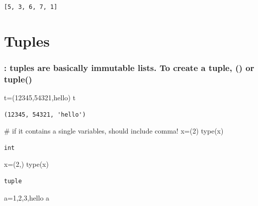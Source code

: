 \documentclass[
  letterpaper,
  DIV=11,
  numbers=noendperiod]{scrreprt}
\newenvironment{Shaded}{\begin{snugshade}}{\end{snugshade}}
\newcommand{\BuiltInTok}[1]{\textcolor[rgb]{0.00,0.23,0.31}{#1}}
\newcommand{\CommentTok}[1]{\textcolor[rgb]{0.37,0.37,0.37}{#1}}
\newcommand{\DecValTok}[1]{\textcolor[rgb]{0.68,0.00,0.00}{#1}}
\newcommand{\NormalTok}[1]{\textcolor[rgb]{0.00,0.23,0.31}{#1}}
\newcommand{\OperatorTok}[1]{\textcolor[rgb]{0.37,0.37,0.37}{#1}}
\newcommand{\StringTok}[1]{\textcolor[rgb]{0.13,0.47,0.30}{#1}}
\begin{document}
\begin{verbatim}
[5, 3, 6, 7, 1]
\end{verbatim}

\section{Tuples}\label{tuples}

\subsubsection{: tuples are basically immutable lists. To create a
tuple, () or
tuple()}\label{tuples-are-basically-immutable-lists.-to-create-a-tuple-or-tuple}

\begin{Shaded}
\begin{Highlighting}[]
\NormalTok{t}\OperatorTok{=}\NormalTok{(}\DecValTok{12345}\NormalTok{,}\DecValTok{54321}\NormalTok{,}\StringTok{\textquotesingle{}hello\textquotesingle{}}\NormalTok{)}
\NormalTok{t}
\end{Highlighting}
\end{Shaded}

\begin{verbatim}
(12345, 54321, 'hello')
\end{verbatim}

\begin{Shaded}
\begin{Highlighting}[]
\CommentTok{\# if it contains a single variables, should include comma!}
\NormalTok{x}\OperatorTok{=}\NormalTok{(}\DecValTok{2}\NormalTok{)}
\BuiltInTok{type}\NormalTok{(x)}
\end{Highlighting}
\end{Shaded}

\begin{verbatim}
int
\end{verbatim}

\begin{Shaded}
\begin{Highlighting}[]
\NormalTok{x}\OperatorTok{=}\NormalTok{(}\DecValTok{2}\NormalTok{,)}
\BuiltInTok{type}\NormalTok{(x)}
\end{Highlighting}
\end{Shaded}

\begin{verbatim}
tuple
\end{verbatim}

\begin{Shaded}
\begin{Highlighting}[]
\NormalTok{a}\OperatorTok{=}\DecValTok{1}\NormalTok{,}\DecValTok{2}\NormalTok{,}\DecValTok{3}\NormalTok{,}\StringTok{\textquotesingle{}hello\textquotesingle{}}
\NormalTok{a}
\end{Highlighting}
\end{Shaded}
\end{document}
